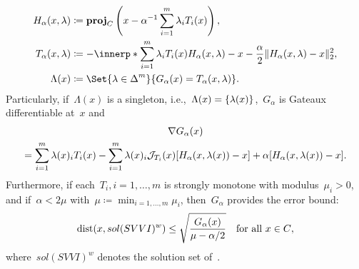 \documentclass[../../main]{subfiles}
\begin{document}
\begin{example}
\begin{description}
\begin{align}
                H_\alpha(x, \lambda) &\coloneqq \proj_C\left( x - \alpha^{-1} \sum_{i = 1}^{m} \lambda_i T_i(x) \right), \\
                T_\alpha(x, \lambda) &\coloneqq - \innerp*{\sum_{i = 1}^{m} \lambda_i T_i(x)}{H_\alpha(x, \lambda) - x} - \frac{\alpha}{2} \norm{H_\alpha(x, \lambda) - x}_2^2, \\
                \Lambda(x) &\coloneqq \Set{\lambda \in \simplex^m}{G_\alpha(x) = T_\alpha(x, \lambda)}
            .\end{align}
            Particularly, if~$\Lambda(x)$ is a singleton, i.e.,~$\Lambda(x) = \lbrace\lambda(x)\rbrace$,~$G_\alpha$ is Gateaux differentiable at~$x$ and
            \begin{multline}
                \nabla G_\alpha(x) \\
                = \sum_{i = 1}^{m} \lambda(x)_i T_i(x) - \sum_{i = 1}^{m} \lambda(x)_i \mathcal{J}_{T_i}(x) [H_\alpha(x, \lambda(x)) - x] + \alpha [H_\alpha(x, \lambda(x)) - x]
            .\end{multline}
            Furthermore, if each~$T_i, i = 1, \dots, m$ is strongly monotone with modulus~$\mu_i > 0$, and if~$\alpha < 2 \mu$ with~$\mu \coloneqq \min_{i = 1, \dots, m} \mu_i$, then~$G_\alpha$ provides the error bound:
            \begin{equation}
                \operatorname{dist}(x, sol(SVVI)^w) \le \sqrt{\frac{G_\alpha(x)}{\mu - \alpha / 2}} \quad \text{for all~$x \in C$}
            ,\end{equation} 
            where~$sol(SVVI)^w$ denotes the solution set of~.
    \end{description}
\end{example}
\end{document}
